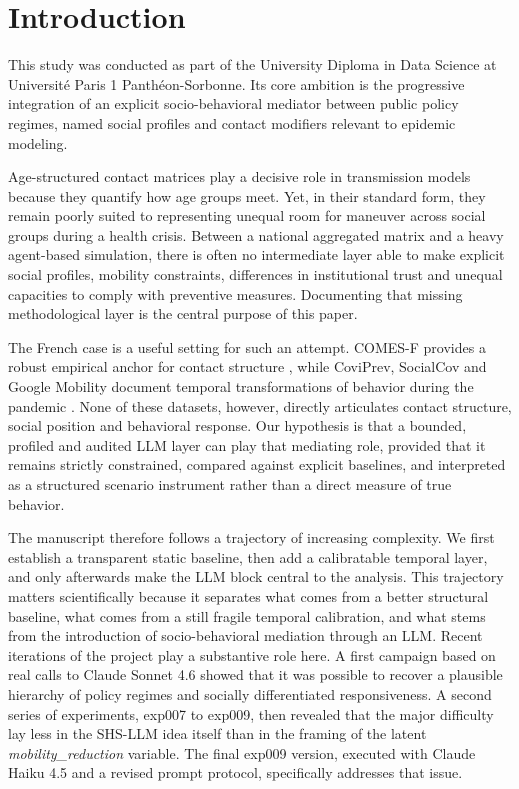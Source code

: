 \documentclass[ROIA,Unicode]{cedram}
\begin{document}
\section{Introduction}
This study was conducted as part of the University Diploma in Data Science at Université Paris 1 Panthéon-Sorbonne. Its core ambition is the progressive integration of an explicit socio-behavioral mediator between public policy regimes, named social profiles and contact modifiers relevant to epidemic modeling.

Age-structured contact matrices play a decisive role in transmission models because they quantify how age groups meet. Yet, in their standard form, they remain poorly suited to representing unequal room for maneuver across social groups during a health crisis. Between a national aggregated matrix and a heavy agent-based simulation, there is often no intermediate layer able to make explicit social profiles, mobility constraints, differences in institutional trust and unequal capacities to comply with preventive measures. Documenting that missing methodological layer is the central purpose of this paper.

The French case is a useful setting for such an attempt. COMES-F provides a robust empirical anchor for contact structure \citep{beraud2015french}, while CoviPrev, SocialCov and Google Mobility document temporal transformations of behavior during the pandemic \citep{coviprev2021,socialcov2024,googlemobility2022}. None of these datasets, however, directly articulates contact structure, social position and behavioral response. Our hypothesis is that a bounded, profiled and audited LLM layer can play that mediating role, provided that it remains strictly constrained, compared against explicit baselines, and interpreted as a structured scenario instrument rather than a direct measure of true behavior.

The manuscript therefore follows a trajectory of increasing complexity. We first establish a transparent static baseline, then add a calibratable temporal layer, and only afterwards make the LLM block central to the analysis. This trajectory matters scientifically because it separates what comes from a better structural baseline, what comes from a still fragile temporal calibration, and what stems from the introduction of socio-behavioral mediation through an LLM. Recent iterations of the project play a substantive role here. A first campaign based on real calls to Claude Sonnet 4.6 showed that it was possible to recover a plausible hierarchy of policy regimes and socially differentiated responsiveness. A second series of experiments, exp007 to exp009, then revealed that the major difficulty lay less in the SHS-LLM idea itself than in the framing of the latent \emph{mobility\_reduction} variable. The final exp009 version, executed with Claude Haiku 4.5 and a revised prompt protocol, specifically addresses that issue.
\end{document}
